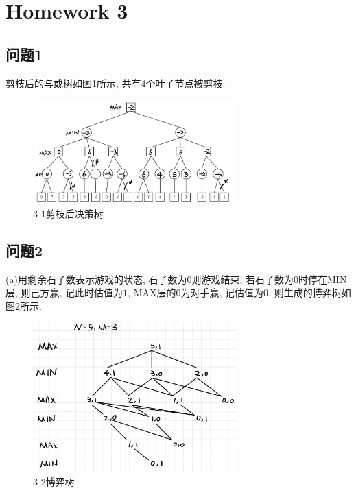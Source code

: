 \section{Homework 3}

\subsection{问题1}

剪枝后的与或树如图\ref{fig:3-1}所示, 共有$4$个叶子节点被剪枝.

\begin{figure}[htbp]
    \centering
    \includegraphics[width=0.7\textwidth]{images/3-1.jpg}
    \caption{3-1剪枝后决策树}\label{fig:3-1}
\end{figure}

\subsection{问题2}

(a)用剩余石子数表示游戏的状态, 石子数为$0$则游戏结束, 若石子数为$0$时停在MIN层, 则己方赢, 记此时估值为$1$, 
MAX层的$0$为对手赢, 记估值为$0$. 则生成的博弈树如图\ref{fig:3-2(1)}所示.

\begin{figure}[htbp]
    \centering
    \includegraphics[width=0.7\textwidth]{images/3-2(1).jpg}
    \caption{3-2博弈树}\label{fig:3-2(1)}
\end{figure}


